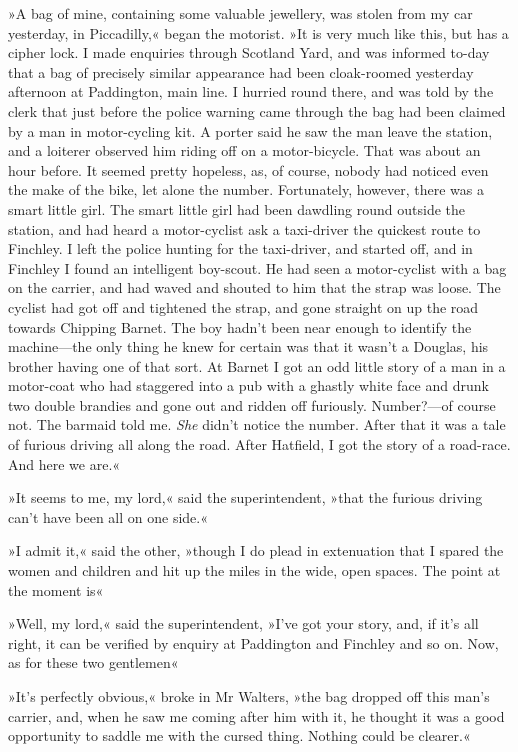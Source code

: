 »A bag of mine, containing some valuable jewellery, was stolen from my car yesterday, in Piccadilly,« began the motorist. »It is very much like this, but has a cipher lock. I made enquiries through Scotland Yard, and was informed to-day that a bag of precisely similar appearance had been cloak-roomed yesterday afternoon at Paddington, main line. I hurried round there, and was told by the clerk that just before the police warning came through the bag had been claimed by a man in motor-cycling kit. A porter said he saw the man leave the station, and a loiterer observed him riding off on a motor-bicycle. That was about an hour before. It seemed pretty hopeless, as, of course, nobody had noticed even the make of the bike, let alone the number. Fortunately, however, there was a smart little girl. The smart little girl had been dawdling round outside the station, and had heard a motor-cyclist ask a taxi-driver the quickest route to Finchley. I left the police hunting for the taxi-driver, and started off, and in Finchley I found an intelligent boy-scout. He had seen a motor-cyclist with a bag on the carrier, and had waved and shouted to him that the strap was loose. The cyclist had got off and tightened the strap, and gone straight on up the road towards Chipping Barnet. The boy hadn't been near enough to identify the machine—the only thing he knew for certain was that it wasn't a Douglas, his brother having one of that sort. At Barnet I got an odd little story of a man in a motor-coat who had staggered into a pub with a ghastly white face and drunk two double brandies and gone out and ridden off furiously. Number?—of course not. The barmaid told me. \textit{She} didn't notice the number. After that it was a tale of furious driving all along the road. After Hatfield, I got the story of a road-race. And here we are.«

»It seems to me, my lord,« said the superintendent, »that the furious driving can't have been all on one side.«

»I admit it,« said the other, »though I do plead in extenuation that I spared the women and children and hit up the miles in the wide, open spaces. The point at the moment is\longdash«

»Well, my lord,« said the superintendent, »I've got your story, and, if it's all right, it can be verified by enquiry at Paddington and Finchley and so on. Now, as for these two gentlemen\longdash«

»It's perfectly obvious,« broke in Mr Walters, »the bag dropped off this man's carrier, and, when he saw me coming after him with it, he thought it was a good opportunity to saddle me with the cursed thing. Nothing could be clearer.«

